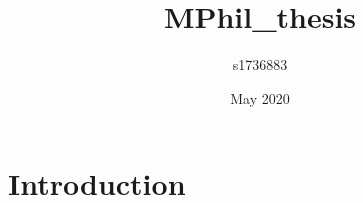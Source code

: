 \documentclass{article}
\title{MPhil_thesis}
\author{s1736883 }
\date{May 2020}
\begin{document}
\maketitle

\section{Introduction}
\end{document}
